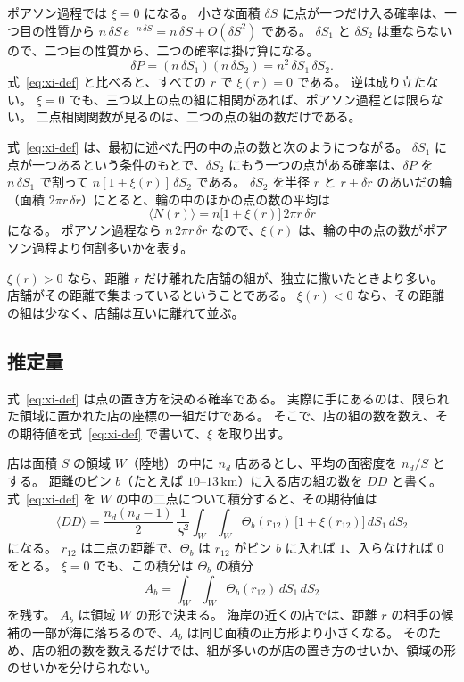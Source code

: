 \documentclass[a4paper,11pt]{ltjsarticle}
\begin{document}
ポアソン過程では $\xi = 0$ になる。
小さな面積 $\delta S$ に点が一つだけ入る確率は、一つ目の性質から $n\,\delta S\, e^{-n\,\delta S} = n\,\delta S + O(\delta S^2)$ である。
$\delta S_1$ と $\delta S_2$ は重ならないので、二つ目の性質から、二つの確率は掛け算になる。
\begin{equation}
  \delta P = (n\,\delta S_1)(n\,\delta S_2) = n^2\, \delta S_1\, \delta S_2 .
\end{equation}
式~\eqref{eq:xi-def} と比べると、すべての $r$ で $\xi(r) = 0$ である。
逆は成り立たない。
$\xi = 0$ でも、三つ以上の点の組に相関があれば、ポアソン過程とは限らない。
二点相関関数が見るのは、二つの点の組の数だけである。

式~\eqref{eq:xi-def} は、最初に述べた円の中の点の数と次のようにつながる。
$\delta S_1$ に点が一つあるという条件のもとで、$\delta S_2$ にもう一つの点がある確率は、$\delta P$ を $n\,\delta S_1$ で割って $n[1 + \xi(r)]\,\delta S_2$ である。
$\delta S_2$ を半径 $r$ と $r + \delta r$ のあいだの輪（面積 $2\pi r\,\delta r$）にとると、輪の中のほかの点の数の平均は
\begin{equation}
  \langle N(r) \rangle = n \bigl[1 + \xi(r)\bigr]\, 2\pi r\, \delta r
\end{equation}
になる。
ポアソン過程なら $n\, 2\pi r\, \delta r$ なので、$\xi(r)$ は、輪の中の点の数がポアソン過程より何割多いかを表す。

$\xi(r) > 0$ なら、距離 $r$ だけ離れた店舗の組が、独立に撒いたときより多い。
店舗がその距離で集まっているということである。
$\xi(r) < 0$ なら、その距離の組は少なく、店舗は互いに離れて並ぶ。

\subsection{推定量}

式~\eqref{eq:xi-def} は点の置き方を決める確率である。
実際に手にあるのは、限られた領域に置かれた店の座標の一組だけである。
そこで、店の組の数を数え、その期待値を式~\eqref{eq:xi-def} で書いて、$\xi$ を取り出す。

店は面積 $S$ の領域 $W$（陸地）の中に $n_d$ 店あるとし、平均の面密度を $n_d/S$ とする。
距離のビン $b$（たとえば $10$--$13\,\mathrm{km}$）に入る店の組の数を $DD$ と書く。
式~\eqref{eq:xi-def} を $W$ の中の二点について積分すると、その期待値は
\begin{equation}
  \langle DD \rangle = \frac{n_d(n_d-1)}{2}\, \frac{1}{S^2} \int_W \! \int_W \Theta_b(r_{12})\, \bigl[1 + \xi(r_{12})\bigr]\, dS_1\, dS_2
  \label{eq:dd-xi}
\end{equation}
になる。
$r_{12}$ は二点の距離で、$\Theta_b$ は $r_{12}$ がビン $b$ に入れば $1$、入らなければ $0$ をとる。
$\xi = 0$ でも、この積分は $\Theta_b$ の積分
\begin{equation}
  A_b = \int_W \! \int_W \Theta_b(r_{12})\, dS_1\, dS_2
\end{equation}
を残す。
$A_b$ は領域 $W$ の形で決まる。
海岸の近くの店では、距離 $r$ の相手の候補の一部が海に落ちるので、$A_b$ は同じ面積の正方形より小さくなる。
そのため、店の組の数を数えるだけでは、組が多いのが店の置き方のせいか、領域の形のせいかを分けられない。
\end{document}
